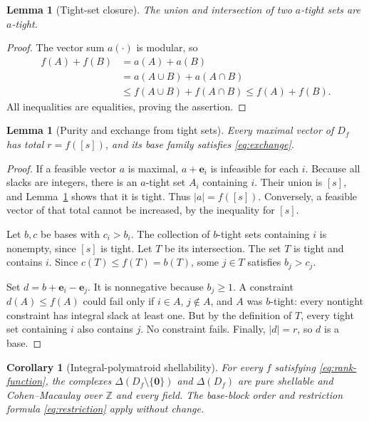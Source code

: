 \documentclass[11pt]{article}
\numberwithin{equation}{section}
\newtheorem{lemma}[theorem]{Lemma}
\newtheorem{corollary}[theorem]{Corollary}
\theoremstyle{definition}
\theoremstyle{remark}
\newcommand{\Z}{\mathbb Z}
\newcommand{\ee}{\mathbf e}
\newcommand{\zero}{\mathbf 0}
\begin{document}
\begin{lemma}[Tight-set closure]
\label{lem:tight}
The union and intersection of two $a$-tight sets are $a$-tight.
\end{lemma}

\begin{proof}
The vector sum $a(\cdot)$ is modular, so
\[
\begin{split}
 f(A)+f(B)&=a(A)+a(B)\\
 &=a(A\cup B)+a(A\cap B)\\
 &\le f(A\cup B)+f(A\cap B)\le f(A)+f(B).
\end{split}
\]
All inequalities are equalities, proving the assertion.
\end{proof}

\begin{lemma}[Purity and exchange from tight sets]
\label{lem:pm-exchange}
Every maximal vector of $D_f$ has total $r=f([s])$, and its base family
satisfies \eqref{eq:exchange}.
\end{lemma}

\begin{proof}
If a feasible vector $a$ is maximal, $a+\ee_i$ is infeasible for each $i$.
Because all slacks are integers, there is an $a$-tight set $A_i$ containing
$i$. Their union is $[s]$, and Lemma~\ref{lem:tight} shows that it is tight.
Thus $|a|=f([s])$. Conversely, a feasible vector of that total cannot be
increased, by the inequality for $[s]$.

Let $b,c$ be bases with $c_i>b_i$. The collection of $b$-tight sets containing
$i$ is nonempty, since $[s]$ is tight. Let $T$ be its intersection. The set
$T$ is tight and contains $i$. Since $c(T)\le f(T)=b(T)$, some $j\in T$
satisfies $b_j>c_j$.

Set $d=b+\ee_i-\ee_j$. It is nonnegative because $b_j\ge1$. A constraint
$d(A)\le f(A)$ could fail only if $i\in A$, $j\notin A$, and $A$ was
$b$-tight: every nontight constraint has integral slack at least one. But
by the definition of $T$, every tight set containing $i$ also contains $j$.
No constraint fails. Finally, $|d|=r$, so $d$ is a base.
\end{proof}

\begin{corollary}[Integral-polymatroid shellability]
\label{cor:all-pm}
For every $f$ satisfying \eqref{eq:rank-function}, the complexes
$\Delta(D_f\setminus\{\zero\})$ and $\Delta(D_f)$ are pure shellable and
Cohen--Macaulay over $\Z$ and every field. The base-block order and
restriction formula \eqref{eq:restriction} apply without change.
\end{corollary}
\end{document}
